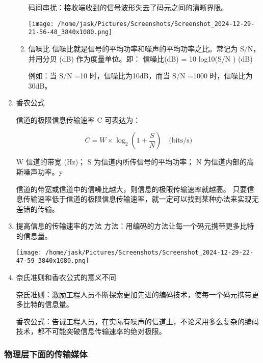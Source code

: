 \documentclass[11pt]{article}
\begin{document}
\begin{enumerate}
\begin{enumerate}
码间串扰：接收端收到的信号波形失去了码元之间的清晰界限。

\begin{center}
\texttt{[image: /home/jask/Pictures/Screenshots/Screenshot\_2024-12-29-21-56-48\_3840x1080.png]}
\end{center}

\item 信噪比
信噪比就是信号的平均功率和噪声的平均功率之比。常记为 S/N，并用分贝 (dB) 作为度量单位。即：
信噪比(dB) = 10 log10(S/N ) (dB)

例如：当 S/N =10 时，信噪比为10dB，而当 S/N =1000 时，信噪比为30dB。
\end{enumerate}
\item 香农公式
\label{sec:orgf6863d5}

信道的极限信息传输速率 C  可表达为：

\begin{equation}
  C= W \times \log_2(1+\frac{S}{N}) \quad \text{(bits/s)}
\end{equation}

W 信道的带宽 (Hz)；
S  为信道内所传信号的平均功率；
N 为信道内部的高斯噪声功率。y

信道的带宽或信道中的信噪比越大，则信息的极限传输速率就越高。 
只要信息传输速率低于信道的极限信息传输速率，就一定可以找到某种办法来实现无差错的传输。
\item 提高信息的传输速率的方法
\label{sec:org1ad0333}
方法：用编码的方法让每一个码元携带更多比特的信息量。

\begin{center}
\texttt{[image: /home/jask/Pictures/Screenshots/Screenshot\_2024-12-29-22-47-59\_3840x1080.png]}
\end{center}
\item 奈氏准则和香农公式的意义不同
\label{sec:org1b51618}

奈氏准则：激励工程人员不断探索更加先进的编码技术，使每一个码元携带更多比特的信息量。

香农公式：告诫工程人员，在实际有噪声的信道上，不论采用多么复杂的编码技术，都不可能突破信息传输速率的绝对极限。
\end{enumerate}
\subsubsection{物理层下面的传输媒体}
\label{sec:orgea2004e}
\end{document}
